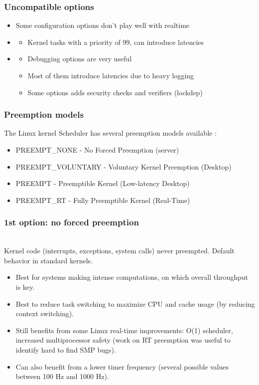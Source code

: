 \begin{frame}
  \frametitle{Uncompatible options}
	\begin{itemize}
		\item Some configuration options don't play well with realtime
		\item {}
			\begin{itemize}
				\item Kernel tasks with a priority of 99, can introduce latencies
			\end{itemize}
		\item {}
			\begin{itemize}
				\item Debugging options are very useful
				\item Most of them introduce latencies due to heavy logging
				\item Some options adds security checks and verifiers (lockdep)
			\end{itemize}
	\end{itemize}
\end{frame}

\begin{frame}
  \frametitle{Preemption models}
  The Linux kernel Scheduler has several preemption models available :
	\begin{itemize}
		\item PREEMPT\_NONE - No Forced Preemption (server)
		\item PREEMPT\_VOLUNTARY - Voluntary Kernel Preemption (Desktop)
		\item PREEMPT - Preemptible Kernel (Low-latency Desktop)
		\item PREEMPT\_RT - Fully Preemptible Kernel (Real-Time)
	\end{itemize}
\end{frame}

\begin{frame}
  \frametitle{1st option: no forced preemption}
  \\
  Kernel code (interrupts, exceptions, system calls) never preempted.
  Default behavior in standard kernels.
  \begin{itemize}
  \item Best for systems making intense computations, on which overall
    throughput is key.
  \item Best to reduce task switching to maximize CPU and cache usage
    (by reducing context switching).
  \item Still benefits from some Linux real-time improvements: O(1)
    scheduler, increased multiprocessor safety (work on RT preemption
    was useful to identify hard to find SMP bugs).
  \item Can also benefit from a lower timer frequency (several possible
        values between 100 Hz and 1000 Hz).
  \end{itemize}
\end{frame}

